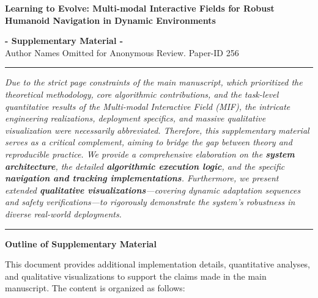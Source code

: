 \documentclass[conference]{IEEEtran}
\begin{document}
\begin{strip}
\begin{center}
\vspace{-5ex}
\textbf{\LARGE \bf
Learning to Evolve: Multi-modal Interactive Fields for Robust Humanoid Navigation in Dynamic Environments
} \\
\vspace{3ex}

\Large{\bf- Supplementary Material -}\\
\vspace{0.6cm}
\normalsize{Author Names Omitted for Anonymous Review. Paper-ID 256}

\vspace{0.5cm}
\hrule
\vspace{0.3cm}

\begin{minipage}{0.96\textwidth} %
\normalsize %
\textit{
Due to the strict page constraints of the main manuscript, which prioritized the theoretical methodology, core algorithmic contributions, and the task-level quantitative results of the Multi-modal Interactive Field (MIF), the intricate engineering realizations, deployment specifics, and massive qualitative visualization were necessarily abbreviated. 
Therefore, this supplementary material serves as a critical complement, aiming to bridge the gap between theory and reproducible practice. We provide a comprehensive elaboration on the \textbf{system architecture}, the detailed \textbf{algorithmic execution logic}, and the specific \textbf{navigation and tracking implementations}. Furthermore, we present extended \textbf{qualitative visualizations}—covering dynamic adaptation sequences and safety verifications—to rigorously demonstrate the system's robustness in diverse real-world deployments.
}
\end{minipage}

\vspace{0.5cm}
\hrule
\vspace{0.3cm}


\noindent\textbf{\large Outline of Supplementary Material}

\vspace{0.2cm}
\begin{minipage}{0.96\textwidth}
This document provides additional implementation details, quantitative analyses, and qualitative visualizations to support the claims made in the main manuscript. The content is organized as follows:


\end{minipage}
\end{center}
\end{strip}
\end{document}
